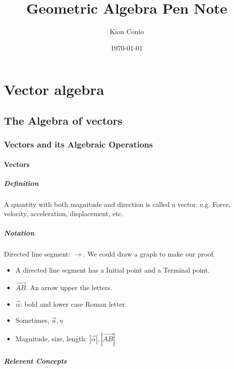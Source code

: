 \documentclass[11pt]{book}
\title{Geometric Algebra Pen Note}
\author{Kion Conio}
\date{\today}
\begin{document}
	
\maketitle
\chapter{Vector algebra}
\section{The Algebra of vectors}

\subsection{Vectors and its Algebraic Operations }

\subsubsection{Vectors}
\paragraph{Definition}
A quantity with both magnitude and direction is called a vector. e.g. Force, velocity, acceleration, displacement, etc.

\paragraph{Notation}
Directed line segment: $\rightarrow $. We could draw a graph to make our proof.


\begin{itemize}

\item A directed line segment has a Initial point and a Terminal point.  

\item $\overrightarrow{AB}$. An arrow upper the letters. 

\item $\vec \alpha$: bold and lower case Roman letter.  

\item Sometimes, $\vec a,\underline u$ 

\item Magnitude, size, length: $|\vec \alpha|,|\overrightarrow {AB}|$


\end{itemize}

\paragraph{Relevent Concepts} 
\end{document}

